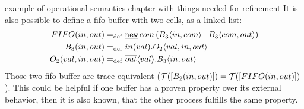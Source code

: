 \begin{old}{example of operational semantics chapter with things needed for refinement}
It is also possible to define a fifo buffer with two cells, as a linked list:
\begin{align*}
	\procdef{FIFO}{in,out}&\define\procres[a]{com}{\procpar{\proccall{B_3}{in,com}}{\proccall{B_3}{com,out}}}\\
	\procdef{B_3}{in,out}&\define\inp{in}{val}.\proccall{O_2}{val,in,out} \\
	\procdef{O_2}{val,in,out}&\define\out{out}{val}.\proccall{B_3}{in,out}
\end{align*}
Those two fifo buffer are trace equivalent ($\traces[\procdef{B_2}{in,out}]=\traces[\procdef{FIFO}{in,out}]$). This could be helpful if one buffer has a proven property over its external behavior, then it is also known, that the other process fulfills the same property.
\end{old}
